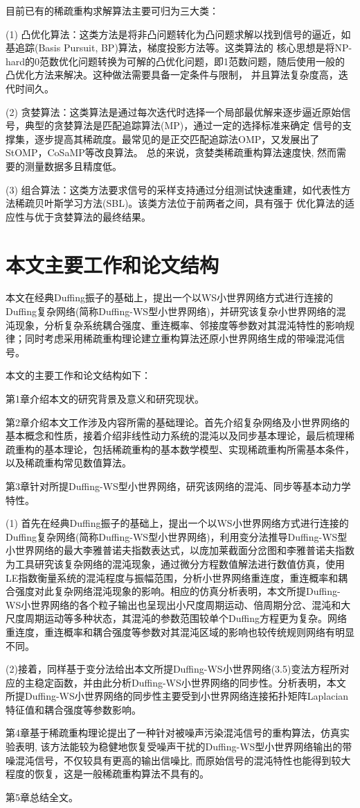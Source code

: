 目前已有的稀疏重构求解算法主要可归为三大类： 

(1)	凸优化算法：这类方法是将非凸问题转化为凸问题求解以找到信号的逼近，如基追踪(Basis Pursuit, BP)算法，梯度投影方法等。这类算法的
核心思想是将NP-hard的0范数优化问题转换为可解的凸优化问题，即1范数问题，随后使用一般的凸优化方法来解决。这种做法需要具备一定条件与限制，
并且算法复杂度高，迭代时间久。

(2)	贪婪算法：这类算法是通过每次迭代时选择一个局部最优解来逐步逼近原始信号，典型的贪婪算法是匹配追踪算法(MP)，通过一定的选择标准来确定
信号的支撑集，逐步提高其稀疏度。最常见的是正交匹配追踪法OMP，又发展出了StOMP，CoSaMP等改良算法。
总的来说，贪婪类稀疏重构算法速度快, 然而需要的测量数据多且精度低。

(3)	组合算法：这类方法要求信号的采样支持通过分组测试快速重建，如代表性方法稀疏贝叶斯学习方法(SBL)。该类方法位于前两者之间，具有强于
优化算法的适应性与优于贪婪算法的最终结果。
\section{本文主要工作和论文结构}
本文在经典Duffing振子的基础上，提出一个以WS小世界网络方式进行连接的Duffing复杂网络(简称Duffing-WS型小世界网络)，并研究该复杂小世界网络的混沌现象，分析复杂系统耦合强度、重连概率、邻接度等参数对其混沌特性的影响规律；同时考虑采用稀疏重构理论建立重构算法还原小世界网络生成的带噪混沌信号。

本文的主要工作和论文结构如下：

第1章介绍本文的研究背景及意义和研究现状。

第2章介绍本文工作涉及内容所需的基础理论。首先介绍复杂网络及小世界网络的基本概念和性质，接着介绍非线性动力系统的混沌以及同步基本理论，最后梳理稀疏重构的基本理论，包括稀疏重构的基本数学模型、实现稀疏重构所需基本条件，以及稀疏重构常见数值算法。

第3章针对所提Duffing-WS型小世界网络，研究该网络的混沌、同步等基本动力学特性。

(1) 首先在经典Duffing振子的基础上，提出一个以WS小世界网络方式进行连接的Duffing复杂网络(简称Duffing-WS型小世界网络)，利用变分法推导Duffing-WS型小世界网络的最大李雅普诺夫指数表达式，以庞加莱截面分岔图和李雅普诺夫指数为工具研究该复杂网络的混沌现象，通过微分方程数值解法进行数值仿真，使用LE指数衡量系统的混沌程度与振幅范围，分析小世界网络重连度，重连概率和耦合强度对此复杂网络混沌现象的影响。相应的仿真分析表明，本文所提Duffing-WS小世界网络的各个粒子输出也呈现出小尺度周期运动、倍周期分岔、混沌和大尺度周期运动等多种状态，其混沌的参数范围较单个Duffing方程更为复杂。网络重连度，重连概率和耦合强度等参数对其混沌区域的影响也较传统规则网络有明显不同。

(2)接着，同样基于变分法给出本文所提Duffing-WS小世界网络(3.5)变法方程所对应的主稳定函数，并由此分析Duffing-WS小世界网络的同步性。分析表明，本文所提Duffing-WS小世界网络的同步性主要受到小世界网络连接拓扑矩阵Laplacian特征值和耦合强度等参数影响。

第4章基于稀疏重构理论提出了一种针对被噪声污染混沌信号的重构算法，仿真实验表明, 该方法能较为稳健地恢复受噪声干扰的Duffing-WS型小世界网络输出的带噪混沌信号，不仅较具有更高的输出信噪比, 而原始信号的混沌特性也能得到较大程度的恢复，这是一般稀疏重构算法不具有的。

第5章总结全文。